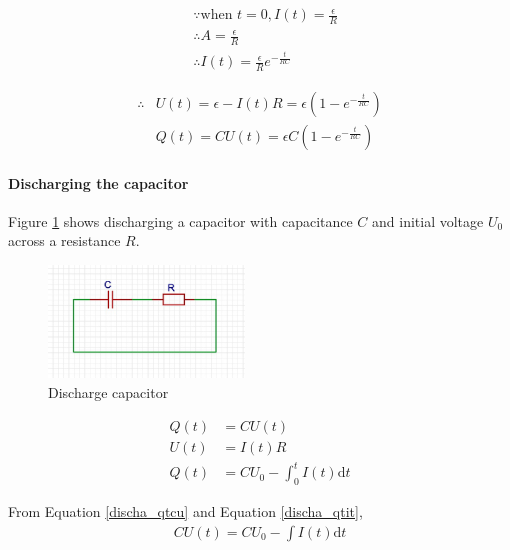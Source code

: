             \begin{align}
                & \because \mbox{when\ } t = 0, I(t) = \frac{\epsilon}{R} \\
                & \therefore A = \frac{\epsilon}{R} \\
                & \therefore I(t) = \frac{\epsilon}{R} e^{- \frac{t}{RC}}
            \end{align}

            \begin{align}
                \therefore & U(t) = \epsilon - I(t) R = \epsilon (1 - e^{- \frac{t}{RC}}) \\
                           & Q(t) = C U(t) = \epsilon C (1 - e^{- \frac{t}{RC}})
            \end{align}

        \paragraph{Discharging the capacitor}
            Figure \ref{discha_capa} shows discharging a capacitor with capacitance $C$ and initial voltage $U_0$ across a resistance $R$. 

            \begin{figure}[H]
                \begin{center}
                    \includegraphics[height=3cm]{electromagnetism_charts/discha_capa.eps}
                \end{center}
                \caption{Discharge capacitor}
                \label{discha_capa}
            \end{figure}

            \begin{align}
                Q(t) &= C U(t) \label{discha_qtcu} \\
                U(t) &= I(t) R \label{discha_utir} \\
                Q(t) &= C U_0 - \int_{0}^{t} I(t) \mathrm{d} t \label{discha_qtit}
            \end{align}

            From Equation \ref{discha_qtcu} and Equation \ref{discha_qtit},
            \begin{align}
                CU(t) = CU_0 - \int I(t) \mathrm{d} t \label{discha_fm1_3}
            \end{align}

